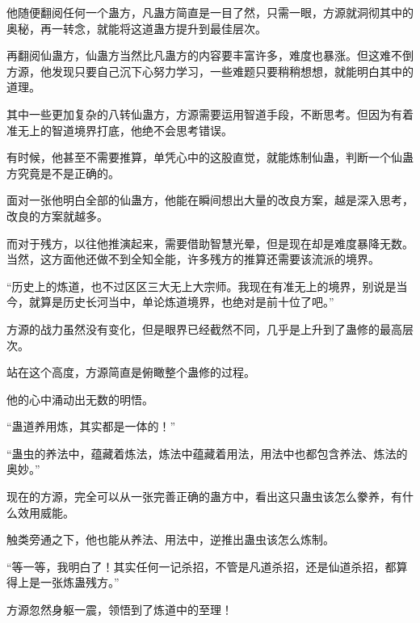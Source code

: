 \begin{this_body}
他随便翻阅任何一个蛊方，凡蛊方简直是一目了然，只需一眼，方源就洞彻其中的奥秘，再一转念，就能将这道蛊方提升到最佳层次。

再翻阅仙蛊方，仙蛊方当然比凡蛊方的内容要丰富许多，难度也暴涨。但这难不倒方源，他发现只要自己沉下心努力学习，一些难题只要稍稍想想，就能明白其中的道理。

其中一些更加复杂的八转仙蛊方，方源需要运用智道手段，不断思考。但因为有着准无上的智道境界打底，他绝不会思考错误。

有时候，他甚至不需要推算，单凭心中的这股直觉，就能炼制仙蛊，判断一个仙蛊方究竟是不是正确的。

面对一张他明白全部的仙蛊方，他能在瞬间想出大量的改良方案，越是深入思考，改良的方案就越多。

而对于残方，以往他推演起来，需要借助智慧光晕，但是现在却是难度暴降无数。当然，这方面他还做不到全知全能，许多残方的推算还需要该流派的境界。

“历史上的炼道，也不过区区三大无上大宗师。我现在有准无上的境界，别说是当今，就算是历史长河当中，单论炼道境界，也绝对是前十位了吧。”

方源的战力虽然没有变化，但是眼界已经截然不同，几乎是上升到了蛊修的最高层次。

站在这个高度，方源简直是俯瞰整个蛊修的过程。

他的心中涌动出无数的明悟。

“蛊道养用炼，其实都是一体的！”

“蛊虫的养法中，蕴藏着炼法，炼法中蕴藏着用法，用法中也都包含养法、炼法的奥妙。”

现在的方源，完全可以从一张完善正确的蛊方中，看出这只蛊虫该怎么豢养，有什么效用威能。

触类旁通之下，他也能从养法、用法中，逆推出蛊虫该怎么炼制。

“等一等，我明白了！其实任何一记杀招，不管是凡道杀招，还是仙道杀招，都算得上是一张炼蛊残方。”

方源忽然身躯一震，领悟到了炼道中的至理！

\end{this_body}

